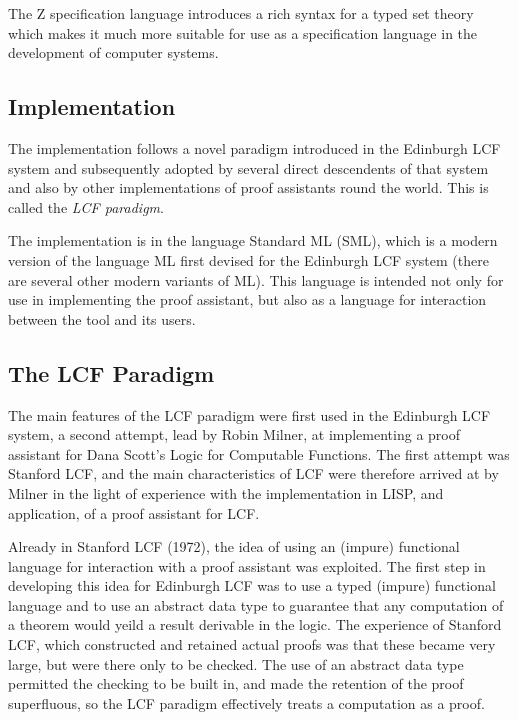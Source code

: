 \documentclass{rbjk}
\begin{document}
\begin{article}
The Z specification language introduces a rich syntax for a typed set
theory which makes it much more suitable for use as a specification
language in the development of computer systems.

\subsection{Implementation}

The implementation follows a novel paradigm introduced in the
Edinburgh LCF system and subsequently adopted by several direct
descendents of that system and also by other implementations of proof
assistants round the world.
This is called the {\it LCF paradigm}.

The implementation is in the language Standard ML (SML), which is a
modern version of the language ML first devised for the Edinburgh LCF
system (there are several other modern variants of ML).
This language is intended not only for use in implementing the proof
assistant, but also as a language for interaction between the tool and
its users.

\subsection{The LCF Paradigm}

The main features of the LCF paradigm were first used in the Edinburgh
LCF system, a second attempt, lead by Robin Milner, at implementing a
proof assistant for Dana Scott's Logic for Computable Functions.
The first attempt was Stanford LCF, and the main characteristics of
LCF were therefore arrived at by Milner in the light of experience
with the implementation in LISP, and application, of a proof assistant
for LCF.

Already in Stanford LCF (1972), the idea of using an (impure) functional
language for interaction with a proof assistant was exploited.
The first step in developing this idea for Edinburgh LCF was to use a
typed (impure) functional language and to use an abstract data type to
guarantee that any computation of a theorem would yeild a result
derivable in the logic.
The experience of Stanford LCF, which constructed and retained actual
proofs was that these became very large, but were there only to be
checked.
The use of an abstract data type permitted the checking to be built
in, and made the retention of the proof superfluous, so the LCF
paradigm effectively treats a computation as a proof.


\end{article}
\end{document}
